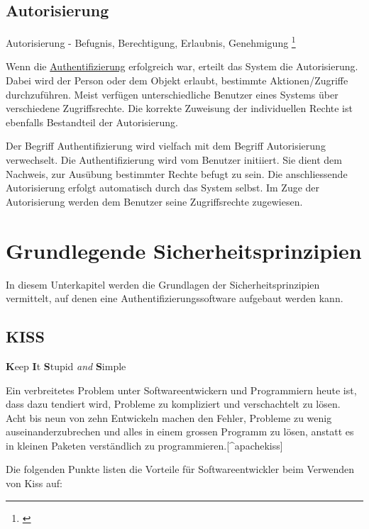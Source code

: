 \subsection{Autorisierung}\label{autorisierung}

Autorisierung - Befugnis, Berechtigung, Erlaubnis, Genehmigung
\footnote{\autocite{duden}}

Wenn die \protect\hyperlink{authentifizierung}{Authentifizierung}
erfolgreich war, erteilt das System die Autorisierung. Dabei wird der
Person oder dem Objekt erlaubt, bestimmte Aktionen/Zugriffe
durchzuführen. Meist verfügen unterschiedliche Benutzer eines Systems
über verschiedene Zugriffsrechte. Die korrekte Zuweisung der
individuellen Rechte ist ebenfalls Bestandteil der Autorisierung.

Der Begriff Authentifizierung wird vielfach mit dem Begriff
Autorisierung verwechselt. Die Authentifizierung wird vom Benutzer
initiiert. Sie dient dem Nachweis, zur Ausübung bestimmter Rechte befugt
zu sein. Die anschliessende Autorisierung erfolgt automatisch durch das
System selbst. Im Zuge der Autorisierung werden dem Benutzer seine
Zugriffsrechte zugewiesen. \autocite{authentifizierungsdeforg}

\newpage

\newpage

\section{Grundlegende
Sicherheitsprinzipien}\label{grundlegende-sicherheitsprinzipien}

In diesem Unterkapitel werden die Grundlagen der Sicherheitsprinzipien
vermittelt, auf denen eine Authentifizierungssoftware aufgebaut werden
kann.

\subsection{KISS}\label{kiss}

\textbf{K}eep \textbf{I}t \textbf{S}tupid \emph{and} \textbf{S}imple

Ein verbreitetes Problem unter Softwareentwickern und Programmiern heute
ist, dass dazu tendiert wird, Probleme zu kompliziert und verschachtelt
zu lösen. Acht bis neun von zehn Entwickeln machen den Fehler, Probleme
zu wenig auseinanderzubrechen und alles in einem grossen Programm zu
lösen, anstatt es in kleinen Paketen verständlich zu
programmieren.{[}\^{}apachekiss{]}

Die folgenden Punkte listen die Vorteile für Softwareentwickler beim
Verwenden von Kiss auf:

